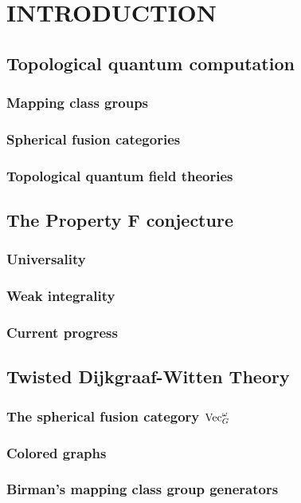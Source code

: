 %
%
%
%



\pagestyle{plain} %
\setcounter{page}{1}


\chapter{\uppercase {Introduction}}


\section{Topological quantum computation}
\subsection{Mapping class groups}
\subsection{Spherical fusion categories}
\subsection{Topological quantum field theories}


\section{The Property F conjecture}
\subsection{Universality}
\subsection{Weak integrality}
\subsection{Current progress}

\section{Twisted Dijkgraaf-Witten Theory}
\subsection{The spherical fusion category $\operatorname{Vec}^\omega_G$}
\subsection{Colored graphs}
\subsection{Birman's mapping class group generators}




